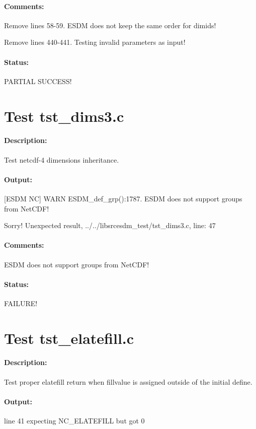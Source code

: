 \paragraph{Comments:} Remove lines 58-59. ESDM does not keep the same order for dimids!

Remove lines 440-441. Testing invalid parameters as input!

\paragraph{Status:} PARTIAL SUCCESS!

\section{Test tst\_dims3.c}

\paragraph{Description:} Test netcdf-4 dimensions inheritance.

\paragraph{Output:} [ESDM NC] WARN ESDM\_def\_grp():1787. ESDM does not support groups from NetCDF!

Sorry! Unexpected result, ../../libsrcesdm\_test/tst\_dims3.c, line: 47

\paragraph{Comments:} ESDM does not support groups from NetCDF!

\paragraph{Status:} FAILURE!

\section{Test tst\_elatefill.c}

\paragraph{Description:} Test proper elatefill return when fillvalue is assigned outside of
the initial define.

\paragraph{Output:} line 41 expecting NC\_ELATEFILL but got 0

